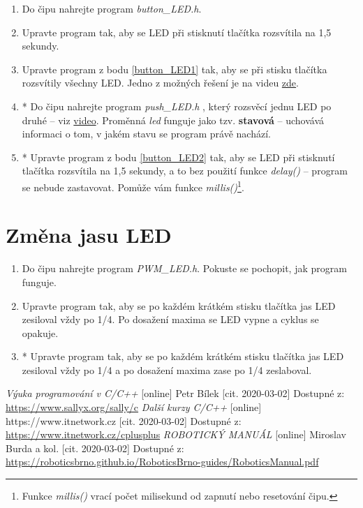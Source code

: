 \documentclass[12pt]{article}
\begin{document}
\begin{enumerate}
	\item Do čipu nahrejte program \textit{button\_LED.h}.\label{button_LED1}
	\item Upravte program tak, aby se LED při stisknutí tlačítka rozsvítila na 1,5 sekundy. \label{button_LED2}
	\item Upravte program  z bodu \ref{button_LED1} tak, aby se při stisku tlačítka rozsvítily všechny LED. Jedno z možných řešení je na videu \href{https://www.youtube.com/watch?v=ugJcHznFWD0&list=PLUcO3yZImuGwjBzWMluj8Pgu0FHjgFYBd&index=2}{zde}. 
	\item * Do čipu nahrejte program \textit{push\_LED.h} , který rozsvěcí jednu LED po druhé -- viz 
	\href{https://www.youtube.com/watch?v=Umqs3IwrQpc}{video}. Proměnná \textit{led} funguje jako tzv. \textbf{stavová} -- uchovává informaci o tom, v jakém stavu se program právě nachází. 
	
	\item * Upravte program z bodu \ref{button_LED2} tak, aby se LED při stisknutí tlačítka rozsvítila na 1,5 sekundy, a to bez použití funkce \textit{delay()} -- program se nebude zastavovat. Pomůže vám funkce \textit{millis()}\footnote{Funkce \textit{millis()} vrací počet milisekund od zapnutí nebo resetování čipu.}.
	\label{button_LED3}
	
\end{enumerate}

\section{Změna jasu LED} \label{PWM_LED}

\begin{enumerate}
	\item Do čipu nahrejte program \textit{PWM\_LED.h}. Pokuste se pochopit, jak program funguje.
	\item Upravte program tak, aby se po každém krátkém stisku tlačítka jas LED zesiloval vždy po 1/4. Po dosažení maxima se LED vypne a cyklus se opakuje. \label{PWM_LED2}
	\item * Upravte program tak, aby se po každém krátkém stisku tlačítka jas LED zesiloval vždy po 1/4 a po dosažení maxima zase po 1/4 zeslaboval. \label{PWM_LED3}
	
\end{enumerate}

\renewcommand{\refname}{Další zdroje}
\begin{thebibliography}{1}
	\textit{Výuka programování v C/C++} [online] Petr Bílek  [cit. 2020-03-02] Dostupné z:  
	\url{https://www.sallyx.org/sally/c}
	\textit{Další kurzy C/C++} [online] https://www.itnetwork.cz [cit. 2020-03-02] Dostupné z:  \url{https://www.itnetwork.cz/cplusplus}
	\textit{ROBOTICKÝ MANUÁL} [online] Miroslav Burda a kol. [cit. 2020-03-02] 
	Dostupné z:  \url{https://roboticsbrno.github.io/RoboticsBrno-guides/RoboticsManual.pdf}		
\end{thebibliography}
\end{document}

